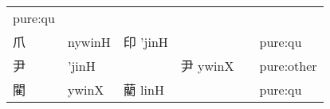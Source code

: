 \documentclass[14pt,a4paper]{scrartcl}
\begin{document}
\begin{longtable}[c]{@{}llllll@{}}
\begin{minipage}[t]{0.14\columnwidth}
pure:qu
\strut\end{minipage}\tabularnewline
\begin{minipage}[t]{0.14\columnwidth}\raggedright\strut
爪
\strut\end{minipage} &
\begin{minipage}[t]{0.14\columnwidth}\raggedright\strut
nywinH
\strut\end{minipage} &
\begin{minipage}[t]{0.14\columnwidth}\raggedright\strut
印 'jinH
\strut\end{minipage} &
\begin{minipage}[t]{0.14\columnwidth}\raggedright\strut
\strut\end{minipage} &
\begin{minipage}[t]{0.14\columnwidth}\raggedright\strut
\strut\end{minipage} &
\begin{minipage}[t]{0.14\columnwidth}\raggedright\strut
pure:qu
\strut\end{minipage}\tabularnewline
\begin{minipage}[t]{0.14\columnwidth}\raggedright\strut
尹
\strut\end{minipage} &
\begin{minipage}[t]{0.14\columnwidth}\raggedright\strut
'jinH
\strut\end{minipage} &
\begin{minipage}[t]{0.14\columnwidth}\raggedright\strut
\strut\end{minipage} &
\begin{minipage}[t]{0.14\columnwidth}\raggedright\strut
尹 ywinX
\strut\end{minipage} &
\begin{minipage}[t]{0.14\columnwidth}\raggedright\strut
\strut\end{minipage} &
\begin{minipage}[t]{0.14\columnwidth}\raggedright\strut
pure:other
\strut\end{minipage}\tabularnewline
\begin{minipage}[t]{0.14\columnwidth}\raggedright\strut
閵
\strut\end{minipage} &
\begin{minipage}[t]{0.14\columnwidth}\raggedright\strut
ywinX
\strut\end{minipage} &
\begin{minipage}[t]{0.14\columnwidth}\raggedright\strut
藺 linH
\strut\end{minipage} &
\begin{minipage}[t]{0.14\columnwidth}\raggedright\strut
\strut\end{minipage} &
\begin{minipage}[t]{0.14\columnwidth}\raggedright\strut
\strut\end{minipage} &
\begin{minipage}[t]{0.14\columnwidth}\raggedright\strut
pure:qu
\strut\end{minipage}\tabularnewline
\bottomrule
\end{longtable}
\end{document}
